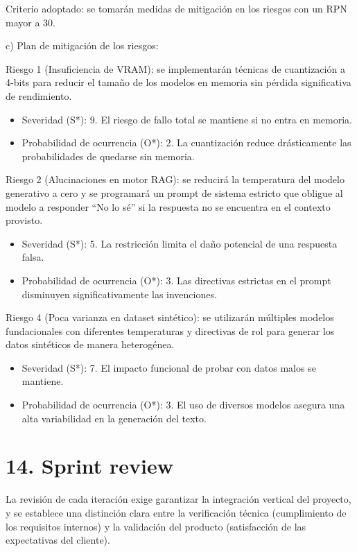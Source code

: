 \documentclass[
11pt, %
]{charter}
\begin{document}
Criterio adoptado: se tomarán medidas de mitigación en los riesgos con un RPN mayor a 30.

c) Plan de mitigación de los riesgos:
 
Riesgo 1 (Insuficiencia de VRAM): se implementarán técnicas de cuantización a 4-bits para reducir el tamaño de los modelos en memoria sin pérdida significativa de rendimiento.
  \begin{itemize}
	\item Severidad (S*): 9. El riesgo de fallo total se mantiene si no entra en memoria.
	\item Probabilidad de ocurrencia (O*): 2. La cuantización reduce drásticamente las probabilidades de quedarse sin memoria.
  \end{itemize}

Riesgo 2 (Alucinaciones en motor RAG): se reducirá la temperatura del modelo generativo a cero y se programará un prompt de sistema estricto que obligue al modelo a responder ``No lo sé'' si la respuesta no se encuentra en el contexto provisto.
  \begin{itemize}
	\item Severidad (S*): 5. La restricción limita el daño potencial de una respuesta falsa.
	\item Probabilidad de ocurrencia (O*): 3. Las directivas estrictas en el prompt disminuyen significativamente las invenciones.
  \end{itemize}

Riesgo 4 (Poca varianza en dataset sintético): se utilizarán múltiples modelos fundacionales con diferentes temperaturas y directivas de rol para generar los datos sintéticos de manera heterogénea.
  \begin{itemize}
	\item Severidad (S*): 7. El impacto funcional de probar con datos malos se mantiene.
	\item Probabilidad de ocurrencia (O*): 3. El uso de diversos modelos asegura una alta variabilidad en la generación del texto.
  \end{itemize}

\clearpage

\section{14. Sprint review}
\label{sec:sprint_review}

La revisión de cada iteración exige garantizar la integración vertical del proyecto, y se establece una distinción clara entre la verificación técnica (cumplimiento de los requisitos internos) y la validación del producto (satisfacción de las expectativas del cliente).
\end{document}

